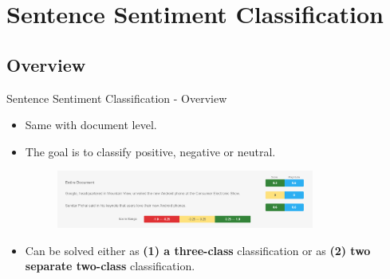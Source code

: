 \documentclass[xcolor=table]{beamer}
\begin{document}
\section{Sentence Sentiment Classification}
\subsection{Overview}

\begin{frame}{Sentence Sentiment Classification - Overview}
    \begin{itemize}
        \item Same with document level.
        \item The goal is to classify positive, negative or neutral\text{*}. \\
        \begin{figure}
            \centering
            \includegraphics[width=0.8\textwidth]{img/sentence-level.png}
        \end{figure}
        \pause
        \item Can be solved either as \textbf{(1) a three-class} classification or as \textbf{(2) two separate two-class} classification.
    \end{itemize}
    
\end{frame}
\end{document}
